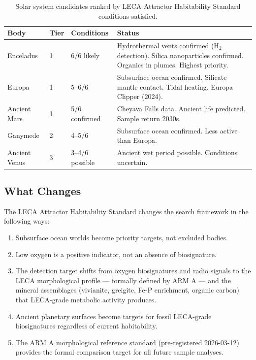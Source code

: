 \documentclass[11pt, a4paper]{article}
\begin{document}
\begin{table}[h]
\centering
\small
\begin{tabularx}{\linewidth}{p{2.2cm}p{1.2cm}p{2.5cm}X}
\toprule
\textbf{Body} & \textbf{Tier} &
\textbf{Conditions} & \textbf{Status} \\
\midrule
Enceladus & 1 & 6/6 likely &
  Hydrothermal vents confirmed (H$_2$ detection).
  Silica nanoparticles confirmed.
  Organics in plumes. Highest priority. \\[0.2em]
Europa & 1 & 5--6/6 &
  Subsurface ocean confirmed.
  Silicate mantle contact.
  Tidal heating.
  Europa Clipper (2024). \\[0.2em]
Ancient Mars & 1 & 5/6 confirmed &
  Cheyava Falls data.
  Ancient life predicted.
  Sample return 2030s. \\[0.2em]
Ganymede & 2 & 4--5/6 &
  Subsurface ocean confirmed.
  Less active than Europa. \\[0.2em]
Ancient Venus & 3 & 3--4/6 possible &
  Ancient wet period possible.
  Conditions uncertain. \\
\bottomrule
\end{tabularx}
\caption{Solar system candidates ranked by LECA
  Attractor Habitability Standard conditions satisfied.}
\end{table}

\subsection{What Changes}

The LECA Attractor Habitability Standard changes the
search framework in the following ways:

\begin{enumerate}[leftmargin=*, label=(\arabic*)]
\item Subsurface ocean worlds become priority targets,
  not excluded bodies.
\item Low oxygen is a positive indicator, not an
  absence of biosignature.
\item The detection target shifts from oxygen biosignatures
  and radio signals to the LECA morphological profile
  --- formally defined by ARM A --- and the mineral
  assemblages (vivianite, greigite, Fe-P enrichment,
  organic carbon) that LECA-grade metabolic activity
  produces.
\item Ancient planetary surfaces become targets for
  fossil LECA-grade biosignatures regardless of current
  habitability.
\item The ARM A morphological reference standard
  (pre-registered 2026-03-12) provides the formal
  comparison target for all future sample analyses.
\end{enumerate}
\end{document}

